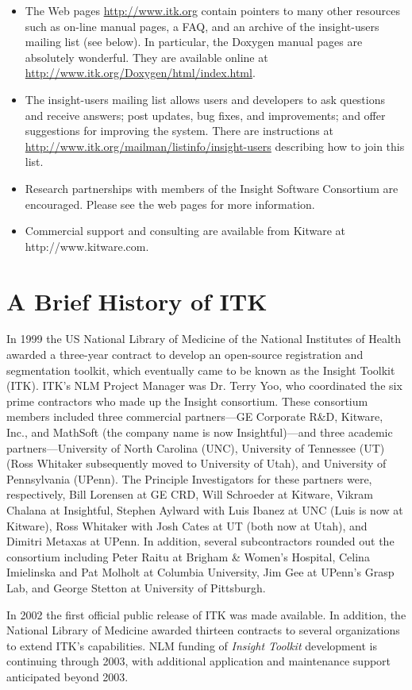 \begin{itemize}
	\item The Web pages \url{http://www.itk.org} contain pointers to
	many other resources such as on-line manual pages, a FAQ, and an
	archive of the insight-users mailing list (see below). In particular,
	the Doxygen manual pages are absolutely wonderful. They are 
        available online at \url{http://www.itk.org/Doxygen/html/index.html}.

	\item The insight-users mailing list allows users and developers to ask
	questions and receive answers; post updates, bug fixes, and
	improvements; and offer suggestions for improving the system. There
	are instructions at 
        \url{http://www.itk.org/mailman/listinfo/insight-users}
	describing how to join this list.

        \item Research partnerships with members of the Insight Software
        Consortium are encouraged. Please see the web pages for more 
        information.

	\item Commercial support and consulting are available from Kitware at
	http://www.kitware.com. 
\end{itemize}

\section{A Brief History of ITK}
\label{sec:History}


In 1999 the US National Library of Medicine of the National Institutes of
Health awarded a three-year contract to develop an open-source registration
and segmentation toolkit, which eventually came to be known as the Insight
Toolkit (ITK). ITK's NLM Project Manager was Dr. Terry Yoo, who coordinated
the six prime contractors who made up the Insight consortium. These
consortium members included three commercial partners---GE Corporate R\&D,
Kitware, Inc., and MathSoft (the company name is now Insightful)---and three
academic partners---University of North Carolina (UNC), University of
Tennessee (UT) (Ross Whitaker subsequently moved to University of Utah), and
University of Pennsylvania (UPenn). The Principle Investigators for these
partners were, respectively, Bill Lorensen at GE CRD, Will Schroeder at
Kitware, Vikram Chalana at Insightful, Stephen Aylward with Luis Ibanez at
UNC (Luis is now at Kitware), Ross Whitaker with Josh Cates at UT (both now
at Utah), and Dimitri Metaxas at UPenn. In addition, several subcontractors
rounded out the consortium including Peter Raitu at Brigham \& Women's
Hospital, Celina Imielinska and Pat Molholt at Columbia University, Jim Gee
at UPenn's Grasp Lab, and George Stetton at University of Pittsburgh.

In 2002 the first official public release of ITK was made available. In
addition, the National Library of Medicine awarded thirteen contracts to
several organizations to extend ITK's capabilities. NLM funding of 
\emph{Insight Toolkit} development is continuing through 2003, with additional
application and maintenance support anticipated beyond 2003. 
